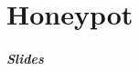 \part{Honeypot}

\begin{frame}
	\partpage
\end{frame}

\begin{frame}
	\frametitle{Slides}
\end{frame}
